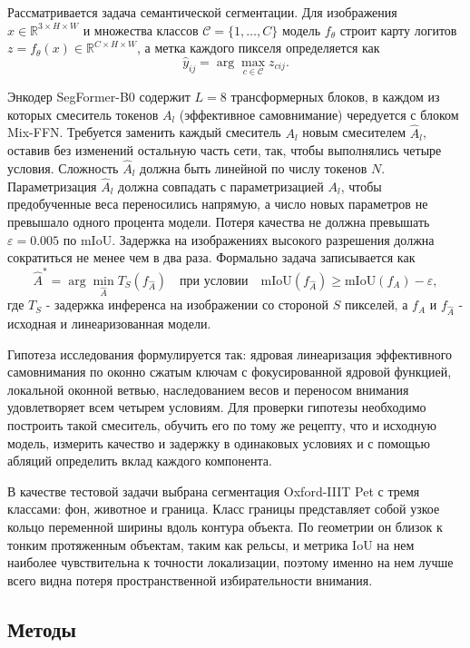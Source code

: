 \documentclass[a4paper,14pt]{article}
\numberwithin{figure}{section}
\numberwithin{table}{section}
\begin{document}
	Рассматривается задача семантической сегментации. Для изображения $x \in \mathbb{R}^{3 \times H \times W}$ и множества классов
	$\mathcal{C} = \{1, \dots, C\}$ модель $f_{\theta}$ строит карту логитов $z = f_{\theta}(x) \in \mathbb{R}^{C \times H \times W}$, а метка каждого пикселя
	определяется как
	$$
	\hat{y}_{ij} = \arg\max_{c \in \mathcal{C}} z_{cij}.
	$$

	Энкодер SegFormer-B0 содержит $L = 8$ трансформерных блоков, в каждом из которых смеситель токенов $A_l$ (эффективное самовнимание) чередуется
	с блоком Mix-FFN. Требуется заменить каждый смеситель $A_l$ новым смесителем $\hat{A}_l$, оставив без изменений остальную часть сети, так, чтобы
	выполнялись четыре условия. Сложность $\hat{A}_l$ должна быть линейной по числу токенов $N$. Параметризация $\hat{A}_l$ должна совпадать с параметризацией
	$A_l$, чтобы предобученные веса переносились напрямую, а число новых параметров не превышало одного процента модели. Потеря качества не должна
	превышать $\varepsilon = 0.005$ по mIoU. Задержка на изображениях высокого разрешения должна сократиться не менее чем в два раза. Формально задача
	записывается как
	$$
	\hat{A}^{*} = \arg\min_{\hat{A}} T_{S}\left(f_{\hat{A}}\right) \quad \text{при условии} \quad \mathrm{mIoU}\left(f_{\hat{A}}\right) \geq \mathrm{mIoU}\left(f_{A}\right) - \varepsilon,
	$$
	где $T_{S}$ - задержка инференса на изображении со стороной $S$ пикселей, а $f_A$ и $f_{\hat{A}}$ - исходная и линеаризованная модели.

	Гипотеза исследования формулируется так: ядровая линеаризация эффективного самовнимания по оконно сжатым ключам с фокусированной ядровой функцией,
	локальной оконной ветвью, наследованием весов и переносом внимания удовлетворяет всем четырем условиям. Для проверки гипотезы необходимо построить
	такой смеситель, обучить его по тому же рецепту, что и исходную модель, измерить качество и задержку в одинаковых условиях и с помощью абляций
	определить вклад каждого компонента.

	В качестве тестовой задачи выбрана сегментация Oxford-IIIT Pet с тремя классами: фон, животное и граница. Класс границы представляет собой узкое кольцо
	переменной ширины вдоль контура объекта. По геометрии он близок к тонким протяженным объектам, таким как рельсы, и метрика IoU на нем наиболее
	чувствительна к точности локализации, поэтому именно на нем лучше всего видна потеря пространственной избирательности внимания.

\subsection{Методы}
\end{document}

